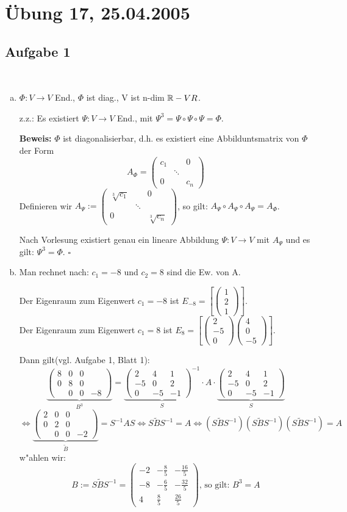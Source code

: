 \documentclass[a4paper,twoside,DIV15,BCOR12mm]{scrbook}
\newcommand{\enua}{\ \begin{enumerate}[a)]}
\newcommand{\une}{\end{enumerate}}
\newcommand{\LRA}{\Leftrightarrow}
\newcommand{\x}{\cdot}
\providecommand{\matr}[1]{\begin{pmatrix}#1\end{pmatrix}}
\newenvironment{bew}{\pagebreak[2]\textbf{Beweis: }}{\qed}
\renewcommand{\qed}{\hspace*{\fill} \ensuremath{\square}}
\begin{document}
\section {Übung 17, 25.04.2005}
\subsection {Aufgabe 1}
\enua
\item
$\Phi: V\to V$ End., $\Phi$ ist diag., V ist n-dim $\mathbb{R}-VR$.\par
z.z.: Es existiert $\Psi: V\to V$ End., mit $\Psi^3=\Psi\circ\Psi\circ\Psi=\Phi$.\par
\begin{bew}$\Phi$ ist diagonalisierbar, d.h. es existiert eine Abbilduntsmatrix von $\Phi$ der Form \[A_\Phi=\matr{c_1 & & 0\\ & \ddots & \\ 0 & & c_n}\]
Definieren wir $A_\Psi:=\matr{\sqrt[3]{c_1} & & 0\\ & \ddots & \\ 0 & & \sqrt[3]{c_n}}$, so gilt: $A_\Psi\circ A_\Psi\circ A_\Psi=A_\Phi$.\par
Nach Vorlesung existiert genau ein lineare Abbildung $\Psi:V\to V$ mit $A_\Psi$ und es gilt: $\Psi^3=\Phi$.
\end{bew}
\item
Man rechnet nach: $c_1=-8$ und $c_2=8$ sind die Ew. von A.\par
Der Eigenraum zum Eigenwert $c_1=-8$ ist $E_{-8}=[\matr{1\\2\\1}].$\\
Der Eigenraum zum Eigenwert $c_1=8$ ist $E_8=[\matr{2\\-5\\0}\matr{4\\0\\-5}].$\par
Dann gilt(vgl. Aufgabe 1, Blatt 1):
\[\underbrace{\matr{8&0&0\\0&8&0\\&0&0&-8}}_{B^3}=
\underbrace{\matr{2&4&1\\-5&0&2\\0&-5&-1}^{-1}}_S\x A\x
\underbrace{\matr{2&4&1\\-5&0&2\\0&-5&-1}}_S\]
\[\LRA\underbrace{\matr{2&0&0\\0&2&0\\&0&0&-2}}_{\tilde B}=S^{-1}AS\LRA S\tilde{B}S^{-1}=A\LRA
(S\tilde BS^{-1})(S\tilde BS^{-1})(S\tilde BS^{-1})=A\]
w"ahlen wir:
\[B:=S\tilde BS^{-1}=\matr{-2&-\frac85&-\frac{16}5\\-8&-\frac65&-\frac{32}5\\4&\frac85&\frac{26}5}\text{, so gilt: }B^3=A\]
\une
\end{document}
